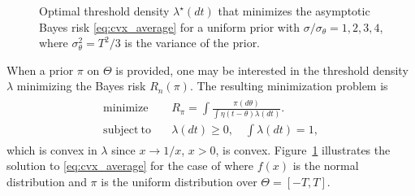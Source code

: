 \begin{figure}
\begin{center}
\caption{\label{fig:opt_density}
Optimal threshold density $\lambda^\star(dt)$ that minimizes the asymptotic Bayes risk \eqref{eq:cvx_average} for a uniform prior with $\sigma/\sigma_\theta=1,2,3,4$, where $\sigma_\theta^2=T^2/3$ is the variance of the prior. 
}
\end{center}
\end{figure}

When a prior $\pi$ on $\Theta$ is provided, one may be interested in the threshold density $\lambda$ minimizing the Bayes risk $R_n(\pi)$. The resulting minimization problem is 
\begin{align}
\label{eq:cvx_average}
\begin{split}
\mathrm{minimize} \quad & R_{\pi} =  \int \frac{\pi(d\theta)}{ \int \eta \left( t-\theta\right) \lambda(dt)}. \\ 
\mathrm{subject~to} \quad & \lambda(dt)\geq 0,\quad \int \lambda(dt) =1, 
\end{split}
\end{align}
which is convex in $\lambda$ since $x \rightarrow 1/x$, $x>0$, is convex. Figure~\ref{fig:opt_density}  illustrates the solution to \eqref{eq:cvx_average} for the case of where $f(x)$ is the normal distribution and $\pi$ is the uniform distribution over $\Theta = [-T,T]$. %

